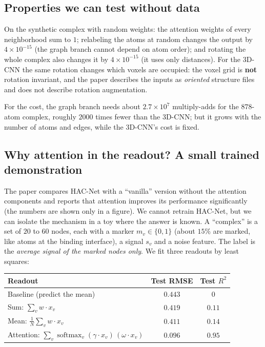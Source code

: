 \documentclass[11pt]{article}
\DeclareMathOperator{\softmax}{softmax}
\begin{document}
\subsection*{Properties we can test without data}
On the synthetic complex with random weights: the attention weights of every neighborhood sum to $1$; relabeling the atoms at random changes the output by $4\times10^{-15}$ (the graph branch cannot depend on atom order); and rotating the whole complex also changes it by $4\times10^{-15}$ (it uses only distances). For the 3D-CNN the same rotation changes which voxels are occupied: the voxel grid is \textbf{not} rotation invariant, and the paper describes the inputs as \emph{oriented} structure files and does not describe rotation augmentation.

For the cost, the graph branch needs about $2.7\times10^{7}$ multiply-adds for the $878$-atom complex, roughly $2000$ times fewer than the 3D-CNN; but it grows with the number of atoms and edges, while the 3D-CNN's cost is fixed.

\subsection*{Why attention in the readout? A small trained demonstration}
The paper compares HAC-Net with a ``vanilla'' version without the attention components and reports that attention improves its performance significantly (the numbers are shown only in a figure). We cannot retrain HAC-Net, but we can isolate the mechanism in a toy where the answer is known. A ``complex'' is a set of $20$ to $60$ nodes, each with a marker $m_v\in\{0,1\}$ (about $15\%$ are marked, like atoms at the binding interface), a signal $s_v$ and a noise feature. The label is the \emph{average signal of the marked nodes only}. We fit three readouts by least squares:

\begin{center}
\small
\begin{tabular}{@{}lcc@{}}
\toprule
Readout & Test RMSE & Test $R^2$\\
\midrule
Baseline (predict the mean) & $0.443$ & $0$\\
Sum: $\sum_vw\cdot x_v$ & $0.419$ & $0.11$\\
Mean: $\frac1N\sum_vw\cdot x_v$ & $0.411$ & $0.14$\\
Attention: $\sum_v\softmax_v(\gamma\cdot x_v)\,(\omega\cdot x_v)$ & $\mathbf{0.096}$ & $\mathbf{0.95}$\\
\bottomrule
\end{tabular}
\end{center}
\end{document}
